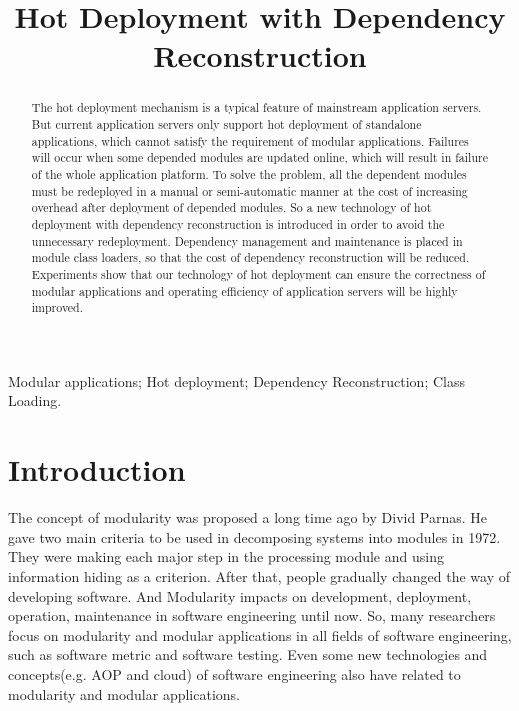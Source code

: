 \documentclass[conference]{IEEEtran}
\begin{document}
\title{Hot Deployment with Dependency Reconstruction}

\author{
}

\maketitle


\begin{abstract}
The hot deployment mechanism is a typical feature of mainstream application servers. 
But current application servers only support hot deployment of standalone applications, which cannot satisfy the requirement of modular applications. 
Failures will occur when some depended modules are updated online, which will result in failure of the whole application platform.
To solve the problem, all the dependent modules must be redeployed in a manual or semi-automatic manner at the cost of increasing overhead after deployment of depended modules.
So a new technology of hot deployment with dependency reconstruction is introduced in order to avoid the unnecessary redeployment.
Dependency management and maintenance is placed in module class loaders, so that the cost of dependency reconstruction will be reduced.
Experiments show that our technology of hot deployment can ensure the correctness of modular applications and operating efficiency of application servers will be highly improved.
\end{abstract}

\begin{IEEEkeywords}
Modular applications; Hot deployment; Dependency Reconstruction; Class Loading.
\end{IEEEkeywords}


\IEEEpeerreviewmaketitle


\section{Introduction\label{sec:introduction}}
The concept of modularity was proposed a long time ago by Divid Parnas\cite{Divid_specification}.
He gave two main criteria\cite{Divid_criteria} to be used in decomposing systems into modules in 1972.
They were making each major step in the processing module and using information hiding as a criterion.
After that, people gradually changed the way of developing software.
And Modularity impacts on development, deployment, operation, maintenance in software engineering until now.
So, many researchers focus on modularity and modular applications in all fields of software engineering, such as software metric\cite{module_metric} and software testing\cite{module_test}.
Even some new technologies and concepts(e.g. AOP\cite{module_aop} and cloud\cite{module_cloud}) of software engineering also have related to modularity and modular applications.
\end{document}
